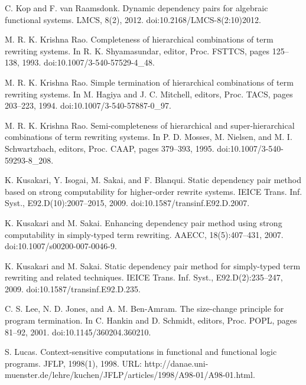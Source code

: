 \par\noindent  [30]  C. Kop and F. van Raamsdonk.  Dynamic dependency pairs for algebraic functional systems.  LMCS, 8(2), 2012.  doi:10.2168/LMCS-8(2:10)2012.  
 
\par\noindent  [31]  M. R. K. Krishna Rao.  Completeness of hierarchical combinations of term rewriting systems.  In R. K. Shyamasundar, editor, Proc. FSTTCS, pages 125–138, 1993.  doi:10.1007/3-540-57529-4\_48.  
 
\par\noindent  [32]  M. R. K. Krishna Rao.  Simple termination of hierarchical combinations of term rewriting systems.  In M. Hagiya and J. C. Mitchell, editors, Proc. TACS, pages 203–223, 1994.  doi:10.1007/3-540-57887-0\_97.  
 
\par\noindent  [33]  M. R. K. Krishna Rao.  Semi-completeness of hierarchical and super-hierarchical combinations of term rewriting systems.  In P. D. Mosses, M. Nielsen, and M. I. Schwartzbach, editors, Proc. CAAP, pages 379–393, 1995.  doi:10.1007/3-540-59293-8\_208.  
 
\par\noindent  [34]  K. Kusakari, Y. Isogai, M. Sakai, and F. Blanqui.  Static dependency pair method based on strong computability for higher-order rewrite systems.  IEICE Trans. Inf. Syst., E92.D(10):2007–2015, 2009.  doi:10.1587/transinf.E92.D.2007.  
 
\par\noindent  [35]  K. Kusakari and M. Sakai.  Enhancing dependency pair method using strong computability in simply-typed term rewriting.  AAECC, 18(5):407–431, 2007.  doi:10.1007/s00200-007-0046-9.  
 
\par\noindent  [36]  K. Kusakari and M. Sakai.  Static dependency pair method for simply-typed term rewriting and related techniques.  IEICE Trans. Inf. Syst., E92.D(2):235–247, 2009.  doi:10.1587/transinf.E92.D.235.  
 
\par\noindent  [37]  C. S. Lee, N. D. Jones, and A. M. Ben-Amram.  The size-change principle for program termination.  In C. Hankin and D. Schmidt, editors, Proc. POPL, pages 81–92, 2001.  doi:10.1145/360204.360210.  
 
\par\noindent  [38]  S. Lucas.  Context-sensitive computations in functional and functional logic programs.  JFLP, 1998(1), 1998.  URL: http://danae.uni-muenster.de/lehre/kuchen/JFLP/articles/1998/A98-01/A98-01.html.  
 
